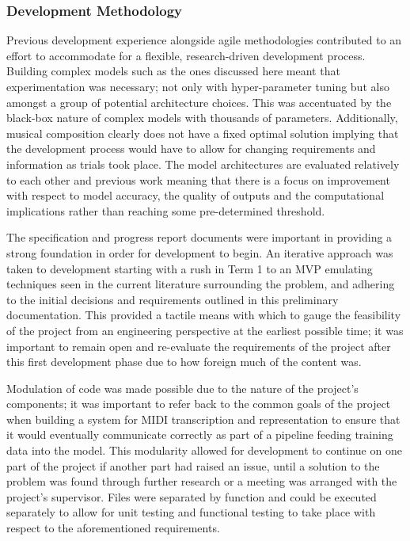 \documentclass[12pt,]{article}
\begin{document}
\hypertarget{development-methodology}{%
\subsubsection{Development Methodology}\label{development-methodology}}

Previous development experience alongside agile methodologies
contributed to an effort to accommodate for a flexible, research-driven
development process. Building complex models such as the ones discussed
here meant that experimentation was necessary; not only with
hyper-parameter tuning but also amongst a group of potential
architecture choices. This was accentuated by the black-box nature of
complex models with thousands of parameters. Additionally, musical
composition clearly does not have a fixed optimal solution implying that
the development process would have to allow for changing requirements
and information as trials took place. The model architectures are
evaluated relatively to each other and previous work meaning that there
is a focus on improvement with respect to model accuracy, the quality of
outputs and the computational implications rather than reaching some
pre-determined threshold.

The specification and progress report documents were important in
providing a strong foundation in order for development to begin. An
iterative approach was taken to development starting with a rush in Term
1 to an MVP emulating techniques seen in the current literature
surrounding the problem, and adhering to the initial decisions and
requirements outlined in this preliminary documentation. This provided a
tactile means with which to gauge the feasibility of the project from an
engineering perspective at the earliest possible time; it was important
to remain open and re-evaluate the requirements of the project after
this first development phase due to how foreign much of the content was.

Modulation of code was made possible due to the nature of the project's
components; it was important to refer back to the common goals of the
project when building a system for MIDI transcription and representation
to ensure that it would eventually communicate correctly as part of a
pipeline feeding training data into the model. This modularity allowed
for development to continue on one part of the project if another part
had raised an issue, until a solution to the problem was found through
further research or a meeting was arranged with the project's
supervisor. Files were separated by function and could be executed
separately to allow for unit testing and functional testing to take
place with respect to the aforementioned requirements.
\end{document}
